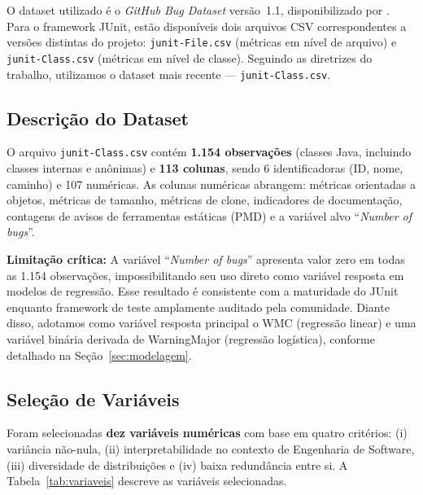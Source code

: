 \documentclass[12pt]{article}
\begin{document}
O dataset utilizado é o \textit{GitHub Bug Dataset} versão~1.1,
disponibilizado por \cite{Ferenc2020}. Para o framework JUnit,
estão disponíveis dois arquivos CSV correspondentes a versões
distintas do projeto: \texttt{junit-File.csv} (métricas em nível
de arquivo) e \texttt{junit-Class.csv} (métricas em nível de
classe). Seguindo as diretrizes do trabalho, utilizamos o dataset
mais recente — \texttt{junit-Class.csv}.

\subsection{Descrição do Dataset}

O arquivo \texttt{junit-Class.csv} contém \textbf{1.154 observações}
(classes Java, incluindo classes internas e anônimas) e \textbf{113
colunas}, sendo 6 identificadoras (ID, nome, caminho) e 107 numéricas.
As colunas numéricas abrangem: métricas orientadas a objetos,
métricas de tamanho, métricas de clone, indicadores de documentação,
contagens de avisos de ferramentas estáticas (PMD) e a variável alvo
``\textit{Number of bugs}''.

\textbf{Limitação crítica:} A variável ``\textit{Number of bugs}'' apresenta
valor zero em todas as 1.154 observações, impossibilitando seu uso direto
como variável resposta em modelos de regressão. Esse resultado é
consistente com a maturidade do JUnit enquanto framework de teste amplamente
auditado pela comunidade. Diante disso, adotamos como variável resposta
principal o WMC (regressão linear) e uma variável binária derivada de
WarningMajor (regressão logística), conforme detalhado na
Seção~\ref{sec:modelagem}.

\subsection{Seleção de Variáveis}

Foram selecionadas \textbf{dez variáveis numéricas} com base em quatro
critérios: (i) variância não-nula, (ii) interpretabilidade no contexto
de Engenharia de Software, (iii) diversidade de distribuições e
(iv) baixa redundância entre si. A Tabela~\ref{tab:variaveis} descreve
as variáveis selecionadas.
\end{document}
